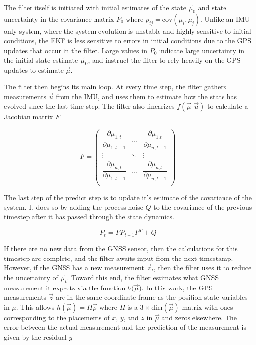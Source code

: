 \documentclass[10pt]{article}
\begin{document}
The filter itself is initiated with initial estimates of the state $\vec{\mu}_0$ and state uncertainty in the covariance matrix $P_0$ where $p_{ij}=\mathrm{cov}(\mu_i, \mu_j)$. Unlike an IMU-only system, where the system evolution is unstable and highly sensitive to initial conditions, the EKF is less sensitive to errors in initial conditions due to the GPS updates that occur in the filter. Large values in $P_0$ indicate large uncertainty in the initial state estimate $\vec{\mu}_0$, and instruct the filter to rely heavily on the GPS updates to estimate $\vec{\mu}$.

The filter then begins its main loop. At every time step, the filter gathers measurements $\vec{u}$ from the IMU, and uses them to estimate how the state has evolved since the last time step. The filter also linearizes $f(\vec{\mu}, \vec{u})$ to calculate a Jacobian matrix $F$


\begin{equation}
  F = \begin{pmatrix}
  \dfrac{\partial \mu_{1,t}}{\partial \mu_{1, t-1}} & \ldots &\dfrac{\partial \mu_{1,t}}{\partial \mu_{n, t-1}} \\
  \vdots & \ddots & \vdots \\
  \dfrac{\partial \mu_{n,t}}{\partial \mu_{1, t-1}} & \ldots & \dfrac{\partial \mu_{n,t}}{\partial \mu_{n, t-1}} \\
  \end{pmatrix}
  \end{equation}

The last step of the predict step is to update it's estimate of the covariance of the system. It does so by adding the process noise $Q$ to the covariance of the previous timestep after it has passed through the state dynamics.

\begin{equation}
P_t = FP_{t-1}F^T + Q
\end{equation}

If there are no new data from the GNSS sensor, then the calculations for this timestep are complete, and the filter awaits input from the next timestamp. However, if the GNSS has a new measurement $\vec{z}_t$, then the filter uses it to reduce the uncertainty of $\vec{\mu}_t$. Toward this end, the filter estimates what GNSS measurement it expects via the function $h(\vec{\mu}$). In this work, the GPS measurements $\vec z$ are in the same coordinate frame as the position state variables in $\mu$. This allows $h(\vec{\mu}) = H\vec{\mu}$ where $H$ is a $3 \times \mathrm{dim}(\vec{\mu})$ matrix with ones corresponding to the placements of $x$, $y$, and $z$ in $\vec{\mu}$ and zeros elsewhere. The error between the actual measurement and the prediction of the measurement is given by the residual $y$
\end{document}
